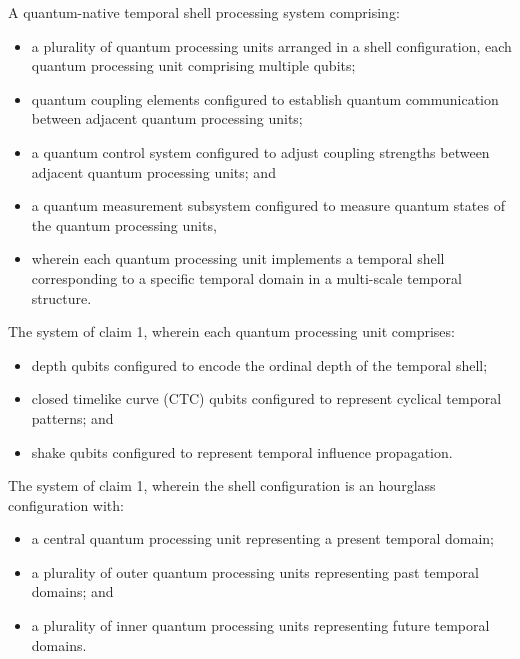 \documentclass[12pt,letterpaper]{article}
\begin{document}
\begin{patentclaims}
    \item A quantum-native temporal shell processing system comprising:
    \begin{itemize}[leftmargin=2em]
        \item a plurality of quantum processing units arranged in a shell configuration, each quantum processing unit comprising multiple qubits;
        \item quantum coupling elements configured to establish quantum communication between adjacent quantum processing units;
        \item a quantum control system configured to adjust coupling strengths between adjacent quantum processing units; and
        \item a quantum measurement subsystem configured to measure quantum states of the quantum processing units,
        \item wherein each quantum processing unit implements a temporal shell corresponding to a specific temporal domain in a multi-scale temporal structure.
    \end{itemize}
    
    \item The system of claim 1, wherein each quantum processing unit comprises:
    \begin{itemize}[leftmargin=2em]
        \item depth qubits configured to encode the ordinal depth of the temporal shell;
        \item closed timelike curve (CTC) qubits configured to represent cyclical temporal patterns; and
        \item shake qubits configured to represent temporal influence propagation.
    \end{itemize}
    
    \item The system of claim 1, wherein the shell configuration is an hourglass configuration with:
    \begin{itemize}[leftmargin=2em]
        \item a central quantum processing unit representing a present temporal domain;
        \item a plurality of outer quantum processing units representing past temporal domains; and
        \item a plurality of inner quantum processing units representing future temporal domains.
    \end{itemize}
    

\end{patentclaims}
\end{document}
